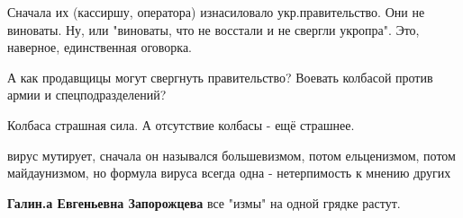 \begin{itemize}
\begin{itemize}
\end{itemize}

 

Сначала их (кассиршу, оператора) изнасиловало укр.правительство. Они не
виноваты. Ну, или "виноваты, что не восстали и не свергли укропра". Это,
наверное, единственная оговорка.

\begin{itemize}
 
А как продавщицы могут свергнуть правительство? Воевать колбасой против армии и спецподразделений?

 
Колбаса страшная сила. А отсутствие колбасы - ещё страшнее.
\end{itemize}

 

вирус мутирует, сначала он назывался большевизмом, потом ельценизмом, потом
майдаунизмом, но формула вируса всегда одна - нетерпимость к мнению других

\begin{itemize}
 
\textbf{Галин.а Евгеньевна Запорожцева} все "измы" на одной грядке растут.
\end{itemize}


\end{itemize}
